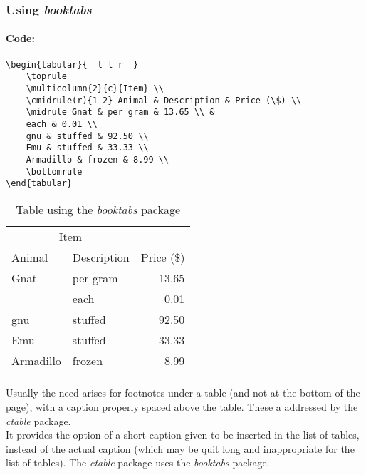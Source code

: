 \subsubsection{Using \emph{booktabs}}
%

\paragraph{Code:}
\begin{verbatim}
\begin{tabular}{  l l r  }
	\toprule
	\multicolumn{2}{c}{Item} \\
	\cmidrule(r){1-2} Animal & Description & Price (\$) \\
	\midrule Gnat & per gram & 13.65 \\ &
	each & 0.01 \\
	gnu & stuffed & 92.50 \\
	Emu & stuffed & 33.33 \\
	Armadillo & frozen & 8.99 \\
	\bottomrule
\end{tabular}
\end{verbatim}

\begin{table}[htbp]
	\centering
	\begin{tabular}{  l l r  }
	\toprule
	\multicolumn{2}{c}{Item} \\
	\cmidrule(r){1-2} Animal & Description & Price (\$) \\
	\midrule Gnat & per gram & 13.65 \\ &
	each & 0.01 \\
	gnu & stuffed & 92.50 \\
	Emu & stuffed & 33.33 \\
	Armadillo & frozen & 8.99 \\
	\bottomrule
	\end{tabular}
	\caption{Table using the \emph{booktabs} package}
	\label{tablebooktabs}
\end{table}

\paragraph{}
Usually the need arises for footnotes under a table (and not at the bottom of the page),
with a caption properly spaced above the table. These a addressed by the \emph{ctable} package. \\
It provides the option of a short caption given to be inserted in the list of tables,
instead of the actual caption (which may be quit long and inappropriate for the list of tables).
The \emph{ctable} package uses the \emph{booktabs} package.
